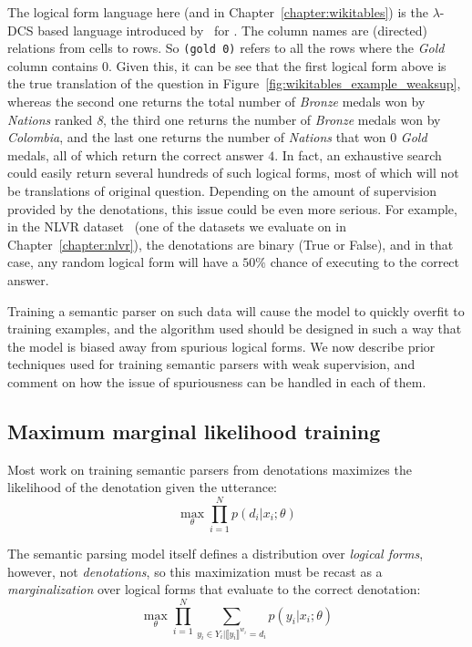 The logical form language here (and in Chapter~\ref{chapter:wikitables}) is the
$\lambda$-DCS based language introduced by~\cite{pasupat2015compositional} for
\WTQ{}. The column names are (directed) relations from cells to rows. So
\texttt{(gold 0)} refers to all the rows where the \emph{Gold} column contains
$0$. Given this, it can be see that the first logical form above is the true
translation of the question in Figure~\ref{fig:wikitables_example_weaksup},
whereas the second one returns the total number of \emph{Bronze} medals won by
\emph{Nations} ranked \emph{8}, the third one returns the number of \emph{Bronze}
medals won by \emph{Colombia}, and the last one returns the number of
\emph{Nations} that won $0$ \emph{Gold} medals, all of which return the correct
answer $4$. In fact, an exhaustive search could easily return several hundreds
of such logical forms, most of which will not be translations of original
question. Depending on the amount of supervision provided by the denotations,
this issue could be even more serious. For example, in the NLVR
dataset~\citep{suhr2017corpus} (one of the datasets we evaluate on in
Chapter~\ref{chapter:nlvr}), the denotations are binary (True or False), and
in that case, any random logical form will have a $50\%$ chance of executing to
the correct answer.

Training a semantic parser on such data will cause the model to quickly overfit to
training examples, and the algorithm used should be designed in such a way that
the model is biased away from spurious logical forms. We now describe prior
techniques used for training semantic parsers with
weak supervision, and comment on how the issue of spuriousness can be handled in
each of them.

\subsection{Maximum marginal likelihood training}\label{sec:mml}
Most work on training semantic parsers from denotations maximizes the
likelihood of the denotation given the utterance:
\begin{equation}
	\max_\theta \prod_{i=1}^N p(d_i|x_i; \theta)
\end{equation}

\noindent The semantic parsing model itself defines a distribution over
\emph{logical forms}, however, not \emph{denotations}, so this maximization
must be recast as a \emph{marginalization} over logical forms that evaluate to
the correct denotation:
\begin{equation}
	\max_\theta \prod_{i=1}^N
	\sum_{y_i \in Y_i | \llbracket y_i \rrbracket^{w_i} = d_i} p(y_i | x_i; \theta)
	\label{eq:mml_objective}
\end{equation}

